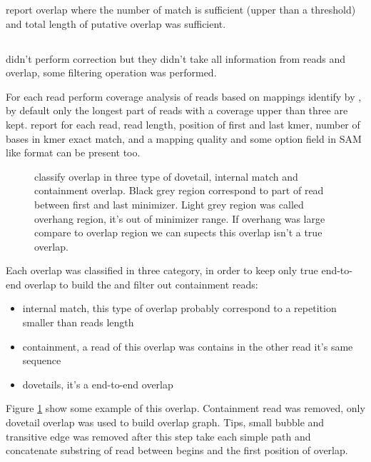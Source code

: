 \documentclass[main]{subfiles}
\begin{document}
\minimap report overlap where the number of match is sufficient (upper than a threshold) and  total length of putative overlap was sufficient. 

\subsection{\miniasm}

\miniasm didn't perform correction but they didn't take all information from reads and overlap, some filtering operation was performed.

For each read \miniasm perform coverage analysis of reads based on mappings identify by \minimap, by default only the longest part of reads with a coverage upper than three are kept. \minimap report for each read, read length, position of first and last kmer, number of bases in kmer exact match,  and a mapping quality and some option field in SAM like format can be present too.

\begin{figure}[ht]
    \centering
    
    \caption{\miniasm classify overlap in three type of dovetail, internal match and containment overlap. Black grey region correspond to part of read between first and last minimizer. Light grey region was called overhang region, it's out of minimizer range. If overhang was large compare to overlap region we can supects this overlap isn't a true overlap.}
    \label{sota:fig:miniasm:ovl_classification}
\end{figure}

Each overlap was classified in three category, in order to keep only true end-to-end overlap to build the \OLC and filter out containment reads:
\begin{itemize}
    \item internal match, this type of overlap probably correspond to a repetition smaller than reads length
    \item containment, a read of this overlap was contains in the other read it's same sequence
    \item dovetails, it's a end-to-end overlap
\end{itemize}
Figure \ref{sota:fig:miniasm:ovl_classification} show some example of this overlap. Containment read was removed, only dovetail overlap was used to build overlap graph. Tips, small bubble and transitive edge was removed after this step \miniasm take each simple path and concatenate substring of read between begins and the first position of overlap.
\end{document}
